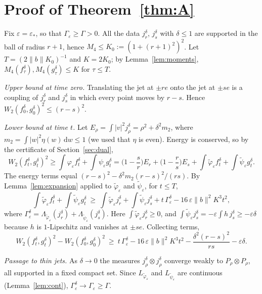 \documentclass[11pt]{amsart}
\theoremstyle{definition}
\newcommand{\dd}{\,\mathrm{d}}
\newcommand{\nb}{\|b\|}
\begin{document}
\section{Proof of Theorem~\ref{thm:A}}\label{sec:proof}

Fix $\varepsilon=\varepsilon_*$, so that $\Gamma_\varepsilon\ge\Gamma>0$. All the data $j^\delta_r$, $j^\delta_s$ with $\delta\le1$ are supported in the ball of radius $r+1$, hence $M_4\le K_0:=(1+(r+1)^2)^2$. Let $T=(2\nb K_0)^{-1}$ and $K=2K_0$; by Lemma~\ref{lem:moments}, $M_4(f^\delta_\tau),M_4(g^\delta_\tau)\le K$ for $\tau\le T$.

\emph{Upper bound at time zero.} Translating the jet at $\pm re$ onto the jet at $\pm se$ is a coupling of $j^\delta_r$ and $j^\delta_s$ in which every point moves by $r-s$. Hence $W_2(f^\delta_0,g^\delta_0)^2\le(r-s)^2$.

\emph{Lower bound at time $t$.} Let $E_\rho=\int|v|^2j^\delta_\rho=\rho^2+\delta^2m_2$, where $m_2=\int|w|^2\eta(w)\dd w\le1$ (we used that $\eta$ is even). Energy is conserved, so by the certificate of Section~\ref{sec:dual},
\[
W_2(f^\delta_t,g^\delta_t)^2\ge\int\varphi_\varepsilon f^\delta_t+\int\psi_\varepsilon g^\delta_t
=\Big(1-\frac sr\Big)E_r+\Big(1-\frac rs\Big)E_s+\int\tilde\varphi_\varepsilon f^\delta_t+\int\tilde\psi_\varepsilon g^\delta_t .
\]
The energy terms equal $(r-s)^2-\delta^2m_2(r-s)^2/(rs)$. By Lemma~\ref{lem:expansion} applied to $\tilde\varphi_\varepsilon$ and $\tilde\psi_\varepsilon$, for $t\le T$,
\[
\int\tilde\varphi_\varepsilon f^\delta_t+\int\tilde\psi_\varepsilon g^\delta_t\ \ge\ \int\tilde\varphi_\varepsilon j^\delta_r+\int\tilde\psi_\varepsilon j^\delta_s+t\,\Gamma^\delta_\varepsilon-16\,\varepsilon\nb^2K^3t^2,
\]
where $\Gamma^\delta_\varepsilon=\Lambda_{\tilde\varphi_\varepsilon}(j^\delta_r)+\Lambda_{\tilde\psi_\varepsilon}(j^\delta_s)$. Here $\int\tilde\varphi_\varepsilon j^\delta_r\ge0$, and $\int\tilde\psi_\varepsilon j^\delta_s=-\varepsilon\int h\,j^\delta_s\ge-\varepsilon\delta$ because $h$ is $1$-Lipschitz and vanishes at $\pm se$. Collecting terms,
\begin{equation}\label{eq:final}
W_2(f^\delta_t,g^\delta_t)^2-W_2(f^\delta_0,g^\delta_0)^2\ \ge\ t\,\Gamma^\delta_\varepsilon-16\,\varepsilon\nb^2K^3t^2-\frac{\delta^2(r-s)^2}{rs}-\varepsilon\delta .
\end{equation}

\emph{Passage to thin jets.} As $\delta\to0$ the measures $j^\delta_\rho\otimes j^\delta_\rho$ converge weakly to $P_\rho\otimes P_\rho$, all supported in a fixed compact set. Since $L_{\tilde\varphi_\varepsilon}$ and $L_{\tilde\psi_\varepsilon}$ are continuous (Lemma~\ref{lem:cont}), $\Gamma^\delta_\varepsilon\to\Gamma_\varepsilon\ge\Gamma$.
\end{document}
